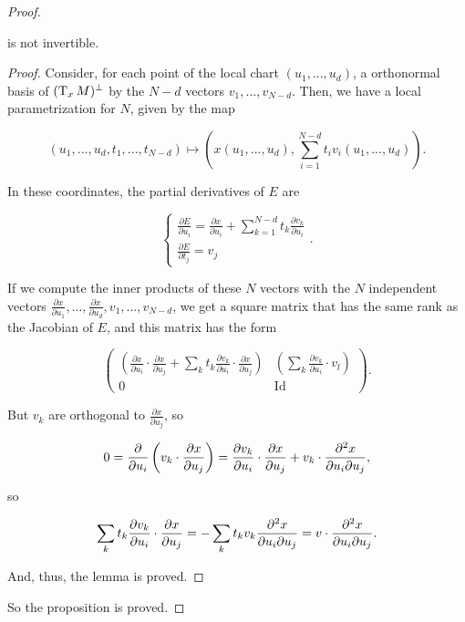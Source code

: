 \begin{proof}
\begin{lema}
is not invertible.
\end{lema}

\begin{proof}
Consider, for each point of the local chart $(u_1,...,u_d)$, a orthonormal basis of $(\operatorname T_xM)^{\bot}$ by the $N-d$ vectors $v_1,...,v_{N-d}$. Then, we have a local parametrization for $N$, given by the map

\begin{displaymath}
(u_1,...,u_d,t_1,...,t_{N-d}) \longmapsto \left( x(u_1,...,u_d), \sum_{i=1}^{N-d} t_i v_i (u_1,...,u_d) \right) .
\end{displaymath}

In these coordinates, the partial derivatives of $E$ are

\begin{displaymath}
\left\{ \begin{array}{l} \frac{\partial E}{\partial u_i} = \frac{\partial x}{\partial u_i} + \sum_{k=1}^{N-d} t_k \frac{\partial v_k}{\partial u_i} \\ \frac{\partial E}{\partial t_j} = v_j \end{array} \right. .
\end{displaymath}

If we compute the inner products of these $N$ vectors with the $N$ independent vectors $\frac{\partial x}{\partial u_1} , ..., \frac{\partial x}{\partial u_d}, v_1, ..., v_{N-d}$, we get a square matrix that has the same rank as the Jacobian of $E$, and this matrix has the form

\begin{displaymath}
\begin{pmatrix} \left( \displaystyle\frac{\partial x}{\partial u_i} \cdot \frac{\partial x}{\partial u_j} + \sum_k t_k \frac{\partial v_k}{\partial u_i} \cdot \frac{\partial x}{\partial u_j} \right) & \left( \displaystyle\sum_k \frac{\partial v_k}{\partial u_i} \cdot v_l \right) \\ 0 & \text{Id} \end{pmatrix} .
\end{displaymath}

But $v_k$ are orthogonal to $\frac{\partial x}{\partial u_j}$, so

\begin{displaymath}
0 = \frac{\partial}{\partial u_i} \left( v_k \cdot \frac{\partial x}{\partial u_j} \right) = \frac{\partial v_k}{\partial u_i} \cdot \frac{\partial x}{\partial u_j} + v_k \cdot \frac{\partial^2 x}{\partial u_i \partial u_j} ,
\end{displaymath}

so

\begin{displaymath}
\sum_k t_k \frac{\partial v_k}{\partial u_i} \cdot \frac{\partial x}{\partial u_j} = - \sum_k t_k v_k \frac{\partial^2 x}{\partial u_i \partial u_j} = v \cdot \frac{\partial^2 x}{\partial u_i \partial u_j} .
\end{displaymath}

And, thus, the lemma is proved.
\end{proof}

So the proposition is proved.
\end{proof}

